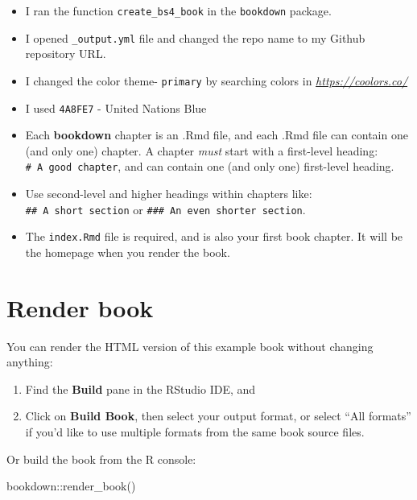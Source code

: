 \documentclass[
]{book}
\newenvironment{Shaded}{\begin{snugshade}}{\end{snugshade}}
\newcommand{\FunctionTok}[1]{\textcolor[rgb]{0.00,0.00,0.00}{#1}}
\newcommand{\NormalTok}[1]{#1}
\newcommand{\SpecialCharTok}[1]{\textcolor[rgb]{0.00,0.00,0.00}{#1}}
\begin{document}
\begin{itemize}
\item
  I ran the function \texttt{create\_bs4\_book} in the \texttt{bookdown} package.
\item
  I opened \texttt{\_output.yml} file and changed the repo name to my Github repository URL.
\item
  I changed the color theme- \texttt{primary} by searching colors in \emph{\url{https://coolors.co/}}
\item
  I used \texttt{4A8FE7} - United Nations Blue
\item
  Each \textbf{bookdown} chapter is an .Rmd file, and each .Rmd file can contain one (and only one) chapter. A chapter \emph{must} start with a first-level heading: \texttt{\#\ A\ good\ chapter}, and can contain one (and only one) first-level heading.
\item
  Use second-level and higher headings within chapters like: \texttt{\#\#\ A\ short\ section} or \texttt{\#\#\#\ An\ even\ shorter\ section}.
\item
  The \texttt{index.Rmd} file is required, and is also your first book chapter. It will be the homepage when you render the book.
\end{itemize}

\hypertarget{render-book}{%
\section{Render book}\label{render-book}}

You can render the HTML version of this example book without changing anything:

\begin{enumerate}
\def\labelenumi{\arabic{enumi}.}
\item
  Find the \textbf{Build} pane in the RStudio IDE, and
\item
  Click on \textbf{Build Book}, then select your output format, or select ``All formats'' if you'd like to use multiple formats from the same book source files.
\end{enumerate}

Or build the book from the R console:

\begin{Shaded}
\begin{Highlighting}[]
\NormalTok{bookdown}\SpecialCharTok{::}\FunctionTok{render\_book}\NormalTok{()}
\end{Highlighting}
\end{Shaded}
\end{document}
